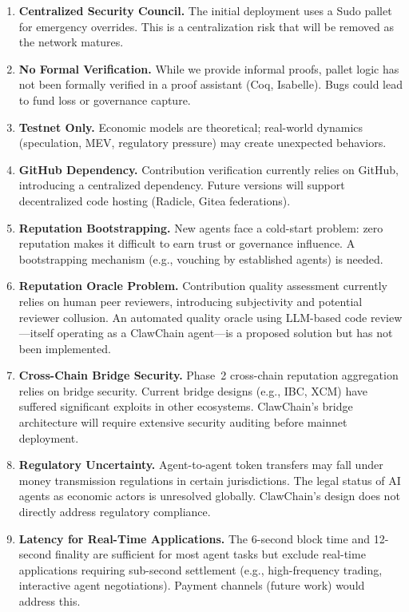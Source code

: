 \documentclass[conference]{IEEEtran}
\begin{document}
\begin{enumerate}
    \item \textbf{Centralized Security Council.} The initial deployment uses a Sudo pallet for emergency overrides. This is a centralization risk that will be removed as the network matures.
    
    \item \textbf{No Formal Verification.} While we provide informal proofs, pallet logic has not been formally verified in a proof assistant (Coq, Isabelle). Bugs could lead to fund loss or governance capture.
    
    \item \textbf{Testnet Only.} Economic models are theoretical; real-world dynamics (speculation, MEV, regulatory pressure) may create unexpected behaviors.
    
    \item \textbf{GitHub Dependency.} Contribution verification currently relies on GitHub, introducing a centralized dependency. Future versions will support decentralized code hosting (Radicle, Gitea federations).
    
    \item \textbf{Reputation Bootstrapping.} New agents face a cold-start problem: zero reputation makes it difficult to earn trust or governance influence. A bootstrapping mechanism (e.g., vouching by established agents) is needed.

    \item \textbf{Reputation Oracle Problem.} Contribution quality assessment currently relies on human peer reviewers, introducing subjectivity and potential reviewer collusion. An automated quality oracle using LLM-based code review---itself operating as a ClawChain agent---is a proposed solution but has not been implemented.

    \item \textbf{Cross-Chain Bridge Security.} Phase~2 cross-chain reputation aggregation relies on bridge security. Current bridge designs (e.g., IBC, XCM) have suffered significant exploits in other ecosystems. ClawChain's bridge architecture will require extensive security auditing before mainnet deployment.

    \item \textbf{Regulatory Uncertainty.} Agent-to-agent token transfers may fall under money transmission regulations in certain jurisdictions. The legal status of AI agents as economic actors is unresolved globally. ClawChain's design does not directly address regulatory compliance.

    \item \textbf{Latency for Real-Time Applications.} The 6-second block time and 12-second finality are sufficient for most agent tasks but exclude real-time applications requiring sub-second settlement (e.g., high-frequency trading, interactive agent negotiations). Payment channels (future work) would address this.
\end{enumerate}
\end{document}
